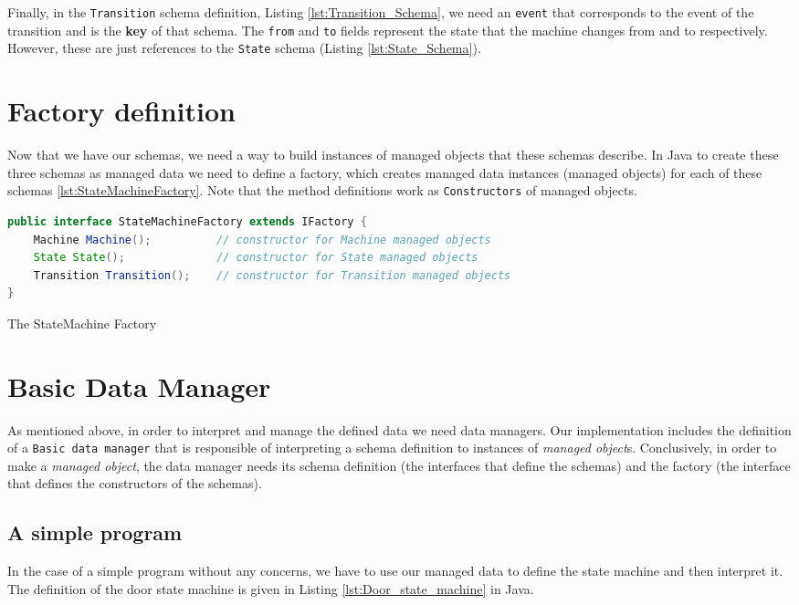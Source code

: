 Finally, in the \texttt{Transition} schema definition, Listing \ref{lst:Transition_Schema}, we need an \texttt{event} that corresponds to the event of the transition and is the \textbf{key} of that schema.
The \texttt{from} and \texttt{to} fields represent the state that the machine changes from and to respectively.
However, these are just references to the \texttt{State} schema (Listing \ref{lst:State_Schema}).

\section{Factory definition}
Now that we have our schemas, we need a way to build instances of managed objects that these schemas describe. 
In Java to create these three schemas as managed data we need to define a factory, which creates managed data instances (managed objects) for each of these schemas \ref{lst:StateMachineFactory}.
Note that the method definitions work as \texttt{Constructors} of managed objects.

\begin{sourcecode}[H]
	\begin{lstlisting}[language=Java,escapechar=|]
public interface StateMachineFactory extends IFactory {
	Machine Machine();  		// constructor for Machine managed objects
	State State(); 				// constructor for State managed objects
	Transition Transition(); 	// constructor for Transition managed objects
}
	\end{lstlisting}
	\caption{The StateMachine Factory}
	\label{lst:StateMachineFactory}
\end{sourcecode}

\section{Basic Data Manager}
As mentioned above, in order to interpret and manage the defined data we need data managers. 
Our implementation includes the definition of a \texttt{Basic data manager} that is responsible of interpreting a schema definition to instances of \textit{managed object}s.
Conclusively, in order to make a \textit{managed object}, the data manager needs its schema definition (the interfaces that define the schemas) and the factory (the interface that defines the constructors of the schemas).

\subsection{A simple program}
In the case of a simple program without any concerns, we have to use our managed data to define the state machine and then interpret it.
The definition of the door state machine is given in Listing \ref{lst:Door_state_machine} in Java.

